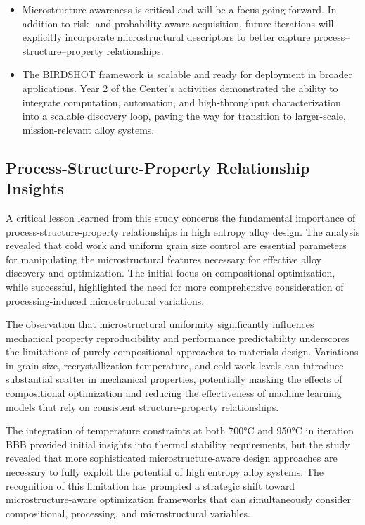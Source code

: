 \begin{itemize}
    \item Microstructure-awareness is critical and will be a focus going forward. In addition to risk- and probability-aware acquisition, future iterations will explicitly incorporate microstructural descriptors to better capture process–structure–property relationships.

    \item The BIRDSHOT framework is scalable and ready for deployment in broader applications. Year 2 of the Center's activities demonstrated the ability to integrate computation, automation, and high-throughput characterization into a scalable discovery loop, paving the way for transition to larger-scale, mission-relevant alloy systems.
\end{itemize}



\subsection{Process-Structure-Property Relationship Insights}

A critical lesson learned from this study concerns the fundamental importance of process-structure-property relationships in high entropy alloy design. The analysis revealed that cold work and uniform grain size control are essential parameters for manipulating the microstructural features necessary for effective alloy discovery and optimization. The initial focus on compositional optimization, while successful, highlighted the need for more comprehensive consideration of processing-induced microstructural variations.

The observation that microstructural uniformity significantly influences mechanical property reproducibility and performance predictability underscores the limitations of purely compositional approaches to materials design. Variations in grain size, recrystallization temperature, and cold work levels can introduce substantial scatter in mechanical properties, potentially masking the effects of compositional optimization and reducing the effectiveness of machine learning models that rely on consistent structure-property relationships.

The integration of temperature constraints at both 700°C and 950°C in iteration BBB provided initial insights into thermal stability requirements, but the study revealed that more sophisticated microstructure-aware design approaches are necessary to fully exploit the potential of high entropy alloy systems. The recognition of this limitation has prompted a strategic shift toward microstructure-aware optimization frameworks that can simultaneously consider compositional, processing, and microstructural variables.


